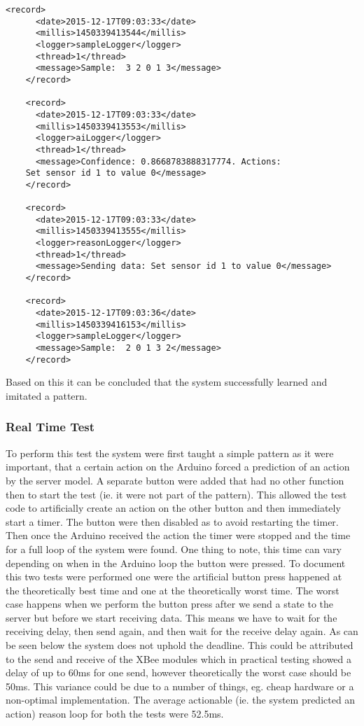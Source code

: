 \begin{lstlisting}[label = Listing:CompletActionTrace, caption = Snippets from different logs to show how the process of making an action]
	<record>
	  <date>2015-12-17T09:03:33</date>
	  <millis>1450339413544</millis>
	  <logger>sampleLogger</logger>
	  <thread>1</thread>
	  <message>Sample:  3 2 0 1 3</message>
	</record>

	<record>
	  <date>2015-12-17T09:03:33</date>
	  <millis>1450339413553</millis>
	  <logger>aiLogger</logger>
	  <thread>1</thread>
	  <message>Confidence: 0.8668783888317774. Actions:
	Set sensor id 1 to value 0</message>
	</record>

	<record>
	  <date>2015-12-17T09:03:33</date>
	  <millis>1450339413555</millis>
	  <logger>reasonLogger</logger>
	  <thread>1</thread>
	  <message>Sending data: Set sensor id 1 to value 0</message>
	</record>

	<record>
	  <date>2015-12-17T09:03:36</date>
	  <millis>1450339416153</millis>
	  <logger>sampleLogger</logger>
	  <message>Sample:  2 0 1 3 2</message>
	</record>
\end{lstlisting}
Based on this it can be concluded that the system successfully learned and imitated a pattern.

\subsubsection{Real Time Test}
To perform this test the system were first taught a simple pattern as it were important, that a certain action on the Arduino forced a prediction of an action by the server model. A separate button were added that had no other function then to start the test (ie. it were not part of the pattern). This allowed the test code to artificially create an action on the other button and then immediately start a timer. The button were then disabled as to avoid restarting the timer. Then once the Arduino received the action the timer were stopped and the time for a full loop of the system were found. One thing to note, this time can vary depending on when in the Arduino loop the button were pressed. To document this two tests were performed one were the artificial button press happened at the theoretically best time and one at the theoretically worst time. The worst case happens when we perform the button press after we send a state to the server but before we start receiving data. This means we have to wait for the receiving delay, then send again, and then wait for the receive delay again. As can be seen below the system does not uphold the deadline. This could be attributed to the send and receive of the XBee modules which in practical testing showed a delay of up to 60ms for one send, however theoretically the worst case should be 50ms\cite{xbee_latency}. This variance could be due to a number of things, eg. cheap hardware or a non-optimal implementation. The average actionable (ie. the system predicted an action) reason loop for both the tests were 52.5ms.

